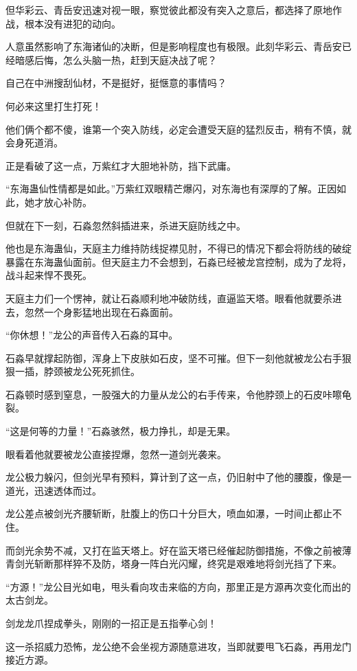 \begin{this_body}
但华彩云、青岳安迅速对视一眼，察觉彼此都没有突入之意后，都选择了原地作战，根本没有进犯的动向。

人意虽然影响了东海诸仙的决断，但是影响程度也有极限。此刻华彩云、青岳安已经暗感后悔，怎么头脑一热，赶到天庭决战了呢？

自己在中洲搜刮仙材，不是挺好，挺惬意的事情吗？

何必来这里打生打死！

他们俩个都不傻，谁第一个突入防线，必定会遭受天庭的猛烈反击，稍有不慎，就会身死道消。

正是看破了这一点，万紫红才大胆地补防，挡下武庸。

“东海蛊仙性情都是如此。”万紫红双眼精芒爆闪，对东海也有深厚的了解。正因如此，她才放心补防。

但就在下一刻，石淼忽然斜插进来，杀进天庭防线之中。

他也是东海蛊仙，天庭主力维持防线捉襟见肘，不得已的情况下都会将防线的破绽暴露在东海蛊仙面前。但天庭主力不会想到，石淼已经被龙宫控制，成为了龙将，战斗起来悍不畏死。

天庭主力们一个愣神，就让石淼顺利地冲破防线，直逼监天塔。眼看他就要杀进去，忽然一个身影猛地出现在石淼面前。

“你休想！”龙公的声音传入石淼的耳中。

石淼早就撑起防御，浑身上下皮肤如石皮，坚不可摧。但下一刻他就被龙公右手狠狠一插，脖颈被龙公死死抓住。

石淼顿时感到窒息，一股强大的力量从龙公的右手传来，令他脖颈上的石皮咔嚓龟裂。

“这是何等的力量！”石淼骇然，极力挣扎，却是无果。

眼看着他就要被龙公直接捏爆，忽然一道剑光袭来。

龙公极力躲闪，但剑光早有预料，算计到了这一点，仍旧射中了他的腰腹，像是一道光，迅速透体而过。

龙公差点被剑光齐腰斩断，肚腹上的伤口十分巨大，喷血如瀑，一时间止都止不住。

而剑光余势不减，又打在监天塔上。好在监天塔已经催起防御措施，不像之前被薄青剑光斩断那样猝不及防，塔身一阵白光闪耀，终究是艰难地将剑光挡了下来。

“方源！”龙公目光如电，甩头看向攻击来临的方向，那里正是方源再次变化而出的太古剑龙。

剑龙龙爪捏成拳头，刚刚的一招正是五指拳心剑！

这一杀招威力恐怖，龙公绝不会坐视方源随意进攻，当即就要甩飞石淼，再用龙门接近方源。


\end{this_body}
